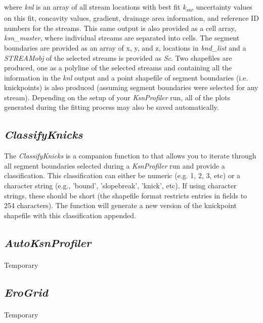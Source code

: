 \noindent
 where \textit{knl} is an array of all stream locations with best fit \textit{k\textsubscript{sn}}, uncertainty values on this fit, concavity values, gradient, drainage area information, and reference ID numbers for the streams. This same output is also provided as a cell array, \textit{ksn\_master}, where individual streams are separated into cells. The segment boundaries are provided as an array of x, y, and z, locations in \textit{bnd\_list} and a \textit{STREAMobj} of the selected streams is provided as \textit{Sc}. Two shapefiles are produced, one as a polyline of the selected streams and containing all the information in the \textit{knl} output and a point shapefile of segment boundaries (i.e. knickpoints) is also produced (assuming segment boundaries were selected for any stream). Depending on the setup of your \textit{KsnProfiler} run, all of the plots generated during the fitting process may also be saved automatically.

\subsection{\textit{ClassifyKnicks}}
The \textit{ClassifyKnicks} is a companion function to  that allows you to iterate through all segment boundaries selected during a \textit{KsnProfiler} run and provide a classification. This classification can either be numeric (e.g. 1, 2, 3, etc) or a character string (e.g., 'bound', 'slopebreak', 'knick', etc). If using character strings, these should be short (the shapefile format restricts entries in fields to 254 characters). The function will generate a new version of the knickpoint shapefile with this classification appended.

\subsection{\textit{AutoKsnProfiler}}
\paragraph{}Temporary

\subsection{\textit{EroGrid}} \label{sec:EroGrid}
\paragraph{}Temporary


